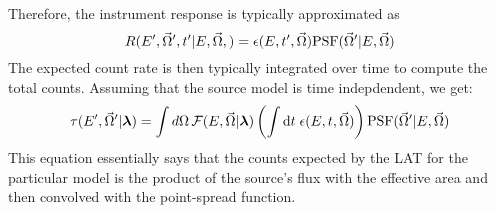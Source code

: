 Therefore, the instrument response is typically approximated as
\begin{equation}
  R(E',\vec\Omega',t'|E,\vec\Omega,) = 
  \epsilon(E,t',\vec\Omega) \text{PSF}(\vec\Omega'|E,\vec\Omega)
\end{equation}
The expected count rate is then typically integrated over time
to compute the total counts. Assuming that the source model
is time indepdendent, we get: 
\begin{equation}
  \tau(E',\vec\Omega'|\boldsymbol{\lambda})
  = \int d\Omega \,
  \mathcal{F}(E,\vec\Omega|\boldsymbol{\lambda}) 
\left(
\int \text{d}t \; \epsilon(E,t,\vec\Omega) 
\right)
\text{PSF}(\vec\Omega'|E,\vec\Omega)
\end{equation}
This equation essentially says that the counts expected by the LAT
for the particular model
is the product of the source's flux with the effective area and then
convolved with the point-spread function.



